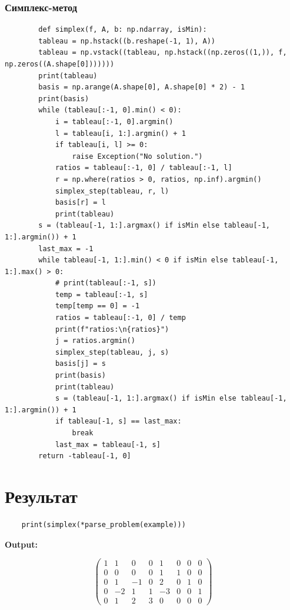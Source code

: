 \documentclass{article}
\begin{document}
\subsubsection{Симплекс-метод}
\begin{listing}[H]
    \begin{verbatim}
        def simplex(f, A, b: np.ndarray, isMin):
        tableau = np.hstack((b.reshape(-1, 1), A))
        tableau = np.vstack((tableau, np.hstack((np.zeros((1,)), f, np.zeros((A.shape[0]))))))
        print(tableau)
        basis = np.arange(A.shape[0], A.shape[0] * 2) - 1
        print(basis)
        while (tableau[:-1, 0].min() < 0):
            i = tableau[:-1, 0].argmin()
            l = tableau[i, 1:].argmin() + 1
            if tableau[i, l] >= 0:
                raise Exception("No solution.")
            ratios = tableau[:-1, 0] / tableau[:-1, l]
            r = np.where(ratios > 0, ratios, np.inf).argmin()
            simplex_step(tableau, r, l)
            basis[r] = l
            print(tableau)
        s = (tableau[-1, 1:].argmax() if isMin else tableau[-1, 1:].argmin()) + 1
        last_max = -1
        while tableau[-1, 1:].min() < 0 if isMin else tableau[-1, 1:].max() > 0:
            # print(tableau[:-1, s])
            temp = tableau[:-1, s]
            temp[temp == 0] = -1
            ratios = tableau[:-1, 0] / temp
            print(f"ratios:\n{ratios}")
            j = ratios.argmin()
            simplex_step(tableau, j, s)
            basis[j] = s
            print(basis)
            print(tableau)
            s = (tableau[-1, 1:].argmax() if isMin else tableau[-1, 1:].argmin()) + 1
            if tableau[-1, s] == last_max:
                break
            last_max = tableau[-1, s]
        return -tableau[-1, 0]

    \end{verbatim}
\end{listing}

\section{Результат}
\begin{listing}[H]
    \begin{verbatim}
    print(simplex(*parse_problem(example)))
    \end{verbatim}
\end{listing}

\textbf{Output:}

$$\begin{pmatrix}
        1 & 1  & 0  & 0 & 1  & 0 & 0 & 0 \\
        0 & 0  & 0  & 0 & 1  & 1 & 0 & 0 \\
        0 & 1  & -1 & 0 & 2  & 0 & 1 & 0 \\
        0 & -2 & 1  & 1 & -3 & 0 & 0 & 1 \\
        0 & 1  & 2  & 3 & 0  & 0 & 0 & 0
    \end{pmatrix}$$
\end{document}
